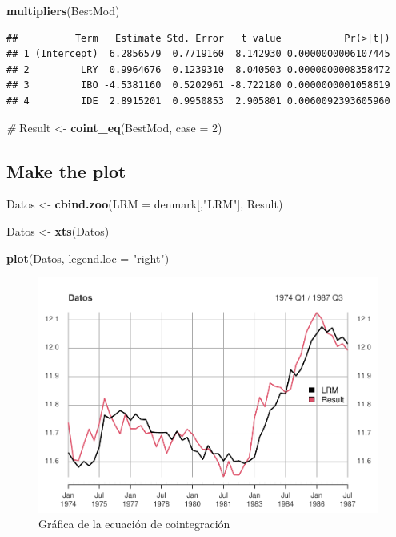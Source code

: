 \documentclass[
]{book}
\newenvironment{Shaded}{\begin{snugshade}}{\end{snugshade}}
\newcommand{\AttributeTok}[1]{\textcolor[rgb]{0.13,0.29,0.53}{#1}}
\newcommand{\CommentTok}[1]{\textcolor[rgb]{0.56,0.35,0.01}{\textit{#1}}}
\newcommand{\DecValTok}[1]{\textcolor[rgb]{0.00,0.00,0.81}{#1}}
\newcommand{\FunctionTok}[1]{\textcolor[rgb]{0.13,0.29,0.53}{\textbf{#1}}}
\newcommand{\NormalTok}[1]{#1}
\newcommand{\OtherTok}[1]{\textcolor[rgb]{0.56,0.35,0.01}{#1}}
\newcommand{\StringTok}[1]{\textcolor[rgb]{0.31,0.60,0.02}{#1}}
\begin{document}
\begin{Shaded}
\begin{Highlighting}[]
\FunctionTok{multipliers}\NormalTok{(BestMod)}
\end{Highlighting}
\end{Shaded}

\begin{verbatim}
##          Term   Estimate Std. Error   t value           Pr(>|t|)
## 1 (Intercept)  6.2856579  0.7719160  8.142930 0.0000000006107445
## 2         LRY  0.9964676  0.1239310  8.040503 0.0000000008358472
## 3         IBO -4.5381160  0.5202961 -8.722180 0.0000000001058619
## 4         IDE  2.8915201  0.9950853  2.905801 0.0060092393605960
\end{verbatim}

\begin{Shaded}
\begin{Highlighting}[]
\CommentTok{\#}
\NormalTok{Result }\OtherTok{\textless{}{-}} \FunctionTok{coint\_eq}\NormalTok{(BestMod, }\AttributeTok{case =} \DecValTok{2}\NormalTok{)}
\end{Highlighting}
\end{Shaded}

\hypertarget{make-the-plot}{%
\subsection{Make the plot}\label{make-the-plot}}

\begin{Shaded}
\begin{Highlighting}[]
\NormalTok{Datos }\OtherTok{\textless{}{-}} \FunctionTok{cbind.zoo}\NormalTok{(}\AttributeTok{LRM =}\NormalTok{ denmark[,}\StringTok{"LRM"}\NormalTok{], Result)}

\NormalTok{Datos }\OtherTok{\textless{}{-}} \FunctionTok{xts}\NormalTok{(Datos)}

\FunctionTok{plot}\NormalTok{(Datos, }\AttributeTok{legend.loc =} \StringTok{"right"}\NormalTok{)}
\end{Highlighting}
\end{Shaded}

\begin{figure}

{\centering \includegraphics[width=0.95\linewidth]{Notas-Series-Tiempo_files/figure-latex/fig92-1} 

}

\caption{Gráfica de la ecuación de cointegración}\label{fig:fig92}
\end{figure}

  
\end{document}
